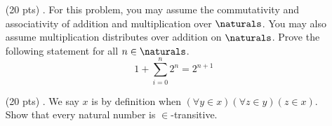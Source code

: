 \begin{enumerate}
  \item[(20 pts) \quad 5.]
    For this problem, you may assume the commutativity and associativity of addition and multiplication over $\naturals$.
    You may also assume multiplication distributes over addition on $\naturals$.
    Prove the following statement for all $n \in \naturals$.
    \begin{equation*}
      1 + \sum_{i = 0}^{n} 2^n = 2^{n + 1}
    \end{equation*}

  \item[(20 pts) \quad 6.]
    We say $x$ is  by definition when $(\forall y \in x)(\forall z \in y)(z \in x)$. \\
    Show that every natural number is $\in$-transitive.
\end{enumerate}


